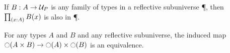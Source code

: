 \documentclass[hott-all.tex]{subfiles}
\begin{document}
% 
\begin{thm}
  If $B:A\to\P$ is any family of types in a reflective subuniverse \P, then $\prd{x:A} B(x)$ is also in \P.
\end{thm}
% 
% 
\begin{cor}
  For any types $A$ and $B$ and any reflective subuniverse, the induced map $\reflect(A\times B) \to \reflect(A) \times \reflect(B)$ is an equivalence.
\end{cor}
% 
\end{document}
